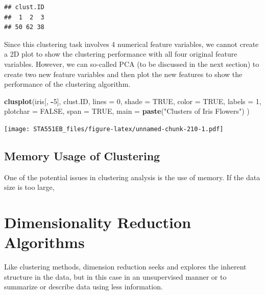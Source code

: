 \documentclass[
]{book}
\newenvironment{Shaded}{\begin{snugshade}}{\end{snugshade}}
\newcommand{\AttributeTok}[1]{\textcolor[rgb]{0.13,0.29,0.53}{#1}}
\newcommand{\ConstantTok}[1]{\textcolor[rgb]{0.56,0.35,0.01}{#1}}
\newcommand{\DecValTok}[1]{\textcolor[rgb]{0.00,0.00,0.81}{#1}}
\newcommand{\FunctionTok}[1]{\textcolor[rgb]{0.13,0.29,0.53}{\textbf{#1}}}
\newcommand{\NormalTok}[1]{#1}
\newcommand{\SpecialCharTok}[1]{\textcolor[rgb]{0.81,0.36,0.00}{\textbf{#1}}}
\newcommand{\StringTok}[1]{\textcolor[rgb]{0.31,0.60,0.02}{#1}}
\begin{document}
\begin{verbatim}
## clust.ID
##  1  2  3 
## 50 62 38
\end{verbatim}

Since this clustering task involves 4 numerical feature variables, we cannot create a 2D plot to show the clustering performance with all four original feature variables. However, we can so-called PCA (to be discussed in the next section) to create two new feature variables and then plot the new features to show the performance of the clustering algorithm.

\begin{Shaded}
\begin{Highlighting}[]
\FunctionTok{clusplot}\NormalTok{(iris[, }\SpecialCharTok{{-}}\DecValTok{5}\NormalTok{],}
\NormalTok{ clust.ID,}
 \AttributeTok{lines =} \DecValTok{0}\NormalTok{,}
 \AttributeTok{shade =} \ConstantTok{TRUE}\NormalTok{,}
 \AttributeTok{color =} \ConstantTok{TRUE}\NormalTok{,}
 \AttributeTok{labels =} \DecValTok{1}\NormalTok{,}
 \AttributeTok{plotchar =} \ConstantTok{FALSE}\NormalTok{,}
 \AttributeTok{span =} \ConstantTok{TRUE}\NormalTok{,}
 \AttributeTok{main =} \FunctionTok{paste}\NormalTok{(}\StringTok{"Clusters of Iris Flowers"}\NormalTok{)}
\NormalTok{)}
\end{Highlighting}
\end{Shaded}

\texttt{[image: STA551EB\_files/figure-latex/unnamed-chunk-210-1.pdf]}

\hypertarget{memory-usage-of-clustering}{%
\subsection{Memory Usage of Clustering}\label{memory-usage-of-clustering}}

One of the potential issues in clustering analysis is the use of memory. If the data size is too large,

\hfill\break

\hypertarget{dimensionality-reduction-algorithms}{%
\section{Dimensionality Reduction Algorithms}\label{dimensionality-reduction-algorithms}}

Like clustering methods, dimension reduction seeks and explores the inherent structure in the data, but in this case in an unsupervised manner or to summarize or describe data using less information.
\end{document}
